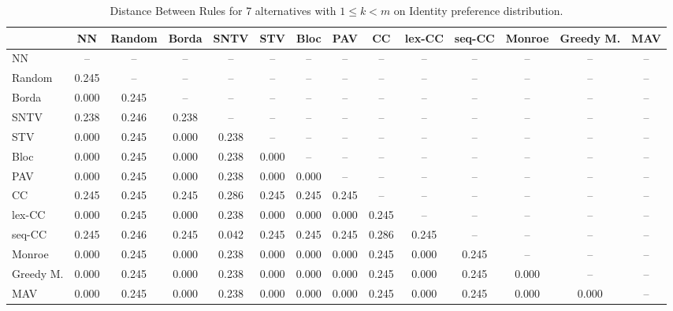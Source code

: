 
\begin{table*}
\centering
\begin{tabular}{lccccccccccccc}
\toprule
 & NN & Random & Borda & SNTV & STV & Bloc & PAV & CC & lex-CC & seq-CC & Monroe & Greedy M. & MAV \\
\midrule
NN & -- & -- & -- & -- & -- & -- & -- & -- & -- & -- & -- & -- & -- \\
Random & 0.245 & -- & -- & -- & -- & -- & -- & -- & -- & -- & -- & -- & -- \\
Borda & 0.000 & 0.245 & -- & -- & -- & -- & -- & -- & -- & -- & -- & -- & -- \\
SNTV & 0.238 & 0.246 & 0.238 & -- & -- & -- & -- & -- & -- & -- & -- & -- & -- \\
STV & 0.000 & 0.245 & 0.000 & 0.238 & -- & -- & -- & -- & -- & -- & -- & -- & -- \\
Bloc & 0.000 & 0.245 & 0.000 & 0.238 & 0.000 & -- & -- & -- & -- & -- & -- & -- & -- \\
PAV & 0.000 & 0.245 & 0.000 & 0.238 & 0.000 & 0.000 & -- & -- & -- & -- & -- & -- & -- \\
CC & 0.245 & 0.245 & 0.245 & 0.286 & 0.245 & 0.245 & 0.245 & -- & -- & -- & -- & -- & -- \\
lex-CC & 0.000 & 0.245 & 0.000 & 0.238 & 0.000 & 0.000 & 0.000 & 0.245 & -- & -- & -- & -- & -- \\
seq-CC & 0.245 & 0.246 & 0.245 & 0.042 & 0.245 & 0.245 & 0.245 & 0.286 & 0.245 & -- & -- & -- & -- \\
Monroe & 0.000 & 0.245 & 0.000 & 0.238 & 0.000 & 0.000 & 0.000 & 0.245 & 0.000 & 0.245 & -- & -- & -- \\
Greedy M. & 0.000 & 0.245 & 0.000 & 0.238 & 0.000 & 0.000 & 0.000 & 0.245 & 0.000 & 0.245 & 0.000 & -- & -- \\
MAV & 0.000 & 0.245 & 0.000 & 0.238 & 0.000 & 0.000 & 0.000 & 0.245 & 0.000 & 0.245 & 0.000 & 0.000 & -- \\
\bottomrule
\end{tabular}

\caption{Distance Between Rules for 7 alternatives with $1 \leq k < m$ on Identity preference distribution.}
\end{table*}
